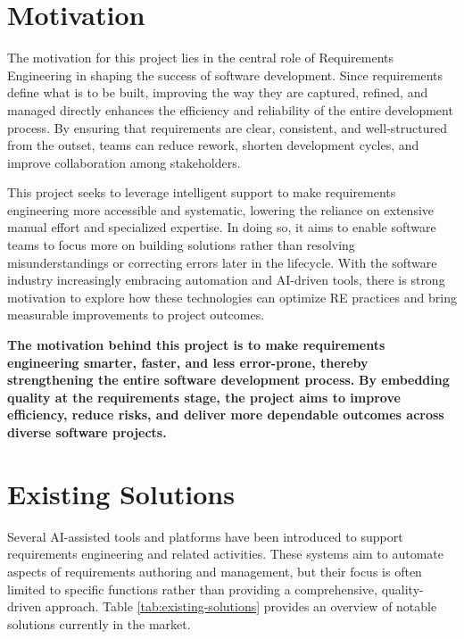 \section{Motivation}
The motivation for this project lies in the central role of Requirements Engineering in shaping the success of software development. Since requirements define what is to be built, improving the way they are captured, refined, and managed directly enhances the efficiency and reliability of the entire development process. By ensuring that requirements are clear, consistent, and well-structured from the outset, teams can reduce rework, shorten development cycles, and improve collaboration among stakeholders.  

This project seeks to leverage intelligent support to make requirements engineering more accessible and systematic, lowering the reliance on extensive manual effort and specialized expertise. In doing so, it aims to enable software teams to focus more on building solutions rather than resolving misunderstandings or correcting errors later in the lifecycle. With the software industry increasingly embracing automation and AI-driven tools, there is strong motivation to explore how these technologies can optimize RE practices and bring measurable improvements to project outcomes.  

\textbf{The motivation behind this project is to make requirements engineering smarter, faster, and less error-prone, thereby strengthening the entire software development process.}  
\textbf{By embedding quality at the requirements stage, the project aims to improve efficiency, reduce risks, and deliver more dependable outcomes across diverse software projects.}
\section{Existing Solutions}
Several AI-assisted tools and platforms have been introduced to support requirements engineering and related activities. These systems aim to automate aspects of requirements authoring and management, but their focus is often limited to specific functions rather than providing a comprehensive, quality-driven approach. Table \ref{tab:existing-solutions} provides an overview of notable solutions currently in the market.

